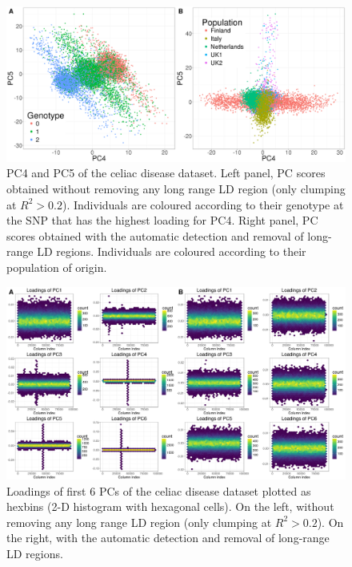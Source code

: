\documentclass[a4paper, 11pt]{article}
\begin{document}
\begin{figure}[htpb]
\centerline{\includegraphics[width=\textwidth]{scores}}
\caption{PC4 and PC5 of the celiac disease dataset. Left panel, PC scores obtained without removing any long range LD region (only clumping at $R^2 > 0.2$). Individuals are coloured according to their genotype at the SNP that has the highest loading for PC4. Right panel, PC scores obtained with the automatic detection and removal of long-range LD regions. Individuals are coloured according to their population of origin.}\label{fig:scores}
\end{figure}

\begin{figure}[htpb]
\centerline{\includegraphics[width=\textwidth]{loadings}}
\caption{Loadings of first 6 PCs of the celiac disease dataset plotted as hexbins (2-D histogram with hexagonal cells). On the left, without removing any long range LD region (only clumping at $R^2 > 0.2$). On the right, with the automatic detection and removal of long-range LD regions.}\label{fig:loadings}
\end{figure}
\end{document}
